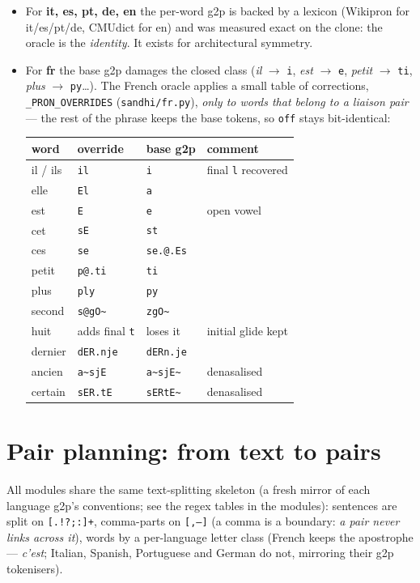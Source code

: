 \documentclass[11pt,a4paper]{report}
\newcommand{\smp}[1]{\texttt{#1}}          %
\newcommand{\tld}{\textasciitilde{}}      %
\begin{document}
\begin{itemize}
  \item For \textbf{it, es, pt, de, en} the per-word g2p is backed by a
        lexicon (Wikipron for it/es/pt/de, CMUdict for en) and was measured
        exact on the clone: the oracle is the \emph{identity}. It exists for
        architectural symmetry.
  \item For \textbf{fr} the base g2p damages the closed class
        (\emph{il} $\rightarrow$ \smp{i}, \emph{est} $\rightarrow$ \smp{e},
        \emph{petit} $\rightarrow$ \smp{ti}, \emph{plus}
        $\rightarrow$ \smp{py}\dots). The French oracle applies a small
        table of corrections, \smp{\_PRON\_OVERRIDES}
        (\smp{sandhi/fr.py}), \emph{only to words that belong to a liaison
        pair} — the rest of the phrase keeps the base tokens, so
        \smp{off} stays bit-identical:
\begin{center}
\begin{tabular}{@{}llll@{}}
\toprule
word & override & base g2p & comment \\
\midrule
il / ils & \smp{il} & \smp{i} & final \smp{l} recovered \\
elle & \smp{El} & \smp{a} & \\
est & \smp{E} & \smp{e} & open vowel \\
cet & \smp{sE} & \smp{st} & \\
ces & \smp{se} & \smp{se.@.Es} & \\
petit & \smp{p@.ti} & \smp{ti} & \\
plus & \smp{ply} & \smp{py} & \\
second & \smp{s@gO\tld} & \smp{zgO\tld} & \\
huit & adds final \smp{t} & loses it & initial glide kept \\
dernier & \smp{dER.nje} & \smp{dERn.je} & \\
ancien & \smp{a\tld{}sjE} & \smp{a\tld{}sjE\tld} & denasalised \\
certain & \smp{sER.tE} & \smp{sERtE\tld} & denasalised \\
\bottomrule
\end{tabular}
\end{center}
\end{itemize}

\section{Pair planning: from text to pairs}

All modules share the same text-splitting skeleton (a fresh mirror of each
language g2p's conventions; see the regex tables in the modules): sentences
are split on \smp{[.!?;:]+}, comma-parts on \smp{[,--]} (a comma is a
boundary: \emph{a pair never links across it}), words by a per-language
letter class (French keeps the apostrophe — \emph{c'est}; Italian, Spanish,
Portuguese and German do not, mirroring their g2p tokenisers).
\end{document}

